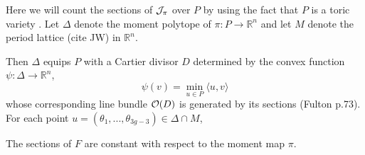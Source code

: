 	Here we will count the sections of $\mathcal{J}_\pi$ over $P$ by using the fact that $P$ is a toric variety \cite[Thm 3.13]{hurtubise_representations_2000}. Let $\Delta$ denote the moment polytope of $\pi:P\to\mathbb{R}^n$ and let $M$ denote the period lattice (cite JW) in $\mathbb{R}^n$. 
	
	Then $\Delta$ equips $P$ with a Cartier divisor $D$ determined by the convex function $\psi:\Delta \to \mathbb{R}^n$,
	\begin{equation}
		\psi(v) = \min_{u\in P}\langle u,v\rangle
	\end{equation}
	whose corresponding line bundle $\mathcal{O}(D)$ is generated by its sections (Fulton p.73). For each point $u = (\theta_1,...,\theta_{3g-3})\in \Delta \cap M$, 
	\begin{lemma}
		The sections of $F$ are constant with respect to the moment map $\pi$.
	\end{lemma} 
\fi
		
	